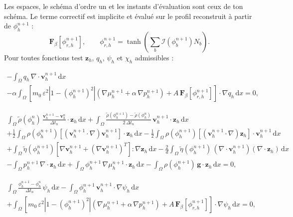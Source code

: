 Les espaces, le schéma d'ordre un et les instants d'évaluation sont ceux de ton schéma. Le terme correctif est implicite et évalué sur le profil reconstruit à partir de $\phi_h^{n+1}$ :
\begin{equation}
  \mathbf{F}_\beta[\phi_{r,h}^{n+1}],
  \qquad
  \phi_{r,h}^{n+1} = \tanh\!\left(\sum_b \mathcal{I}\!\left(\phi_b^{n+1}\right)N_b\right).
\end{equation}
Pour toutes fonctions test $\mathbf{z}_h$, $q_h$, $\psi_h$ et $\chi_h$ admissibles :

\begin{multline}\label{cp:h-continuite}
  -\int_{\Omega} q_h\,\nabla\cdot\mathbf{v}_h^{n+1}\,\mathrm{d}x\\
  - \alpha\int_{\Omega}\left[m_0\,\varepsilon^{2}\left|1-(\phi_h^{n+1})^{2}\right|
    \left(\nabla\mu_h^{n+1} + \alpha\,\nabla p_h^{n+1}\right)
    + A\,\mathbf{F}_\beta[\phi_{r,h}^{n+1}]\right]\cdot\nabla q_h\,\mathrm{d}x = 0,
\end{multline}

\begin{multline}\label{cp:h-qdm}
  \int_{\Omega} \tilde{\rho}(\phi_h^{n})\,\frac{\mathbf{v}_h^{n+1}-\mathbf{v}_h^{n}}{\Delta t_n}\cdot\mathbf{z}_h\,\mathrm{d}x
  + \int_{\Omega} \frac{\tilde{\rho}(\phi_h^{n+1}) - \tilde{\rho}(\phi_h^{n})}{2\,\Delta t_n}\,\mathbf{v}_h^{n+1}\cdot\mathbf{z}_h\,\mathrm{d}x\\
  + \frac{1}{2}\int_{\Omega} \rho(\phi_h^{n+1})\left[(\mathbf{v}_h^{n+1}\cdot\nabla)\mathbf{v}_h^{n+1}\right]\cdot\mathbf{z}_h\,\mathrm{d}x
  - \frac{1}{2}\int_{\Omega} \rho(\phi_h^{n+1})\left[(\mathbf{v}_h^{n+1}\cdot\nabla)\mathbf{z}_h\right]\cdot\mathbf{v}_h^{n+1}\,\mathrm{d}x\\
  + \int_{\Omega} \tilde{\eta}(\phi_h^{n+1})\left[\nabla\mathbf{v}_h^{n+1} + (\nabla\mathbf{v}_h^{n+1})^{T}\right] : \nabla\mathbf{z}_h\,\mathrm{d}x
  - \frac{2}{d}\int_{\Omega} \tilde{\eta}(\phi_h^{n+1})\,(\nabla\cdot\mathbf{v}_h^{n+1})(\nabla\cdot\mathbf{z}_h)\,\mathrm{d}x\\
  - \int_{\Omega} p_h^{n+1}\,\nabla\cdot\mathbf{z}_h\,\mathrm{d}x
  + \int_{\Omega} \phi_h^{n+1}\,\nabla\mu_h^{n+1}\cdot\mathbf{z}_h\,\mathrm{d}x
  - \int_{\Omega} \rho(\phi_h^{n+1})\,\mathbf{g}\cdot\mathbf{z}_h\,\mathrm{d}x = 0,
\end{multline}

\begin{multline}\label{cp:h-phase}
  \int_{\Omega} \frac{\phi_h^{n+1}-\phi_h^{n}}{\Delta t_n}\,\psi_h\,\mathrm{d}x
  - \int_{\Omega} \phi_h^{n+1}\,\mathbf{v}_h^{n+1}\cdot\nabla\psi_h\,\mathrm{d}x\\
  + \int_{\Omega}\left[m_0\,\varepsilon^{2}\left|1-(\phi_h^{n+1})^{2}\right|
    \left(\nabla\mu_h^{n+1} + \alpha\,\nabla p_h^{n+1}\right)
    + A\,\mathbf{F}_\beta[\phi_{r,h}^{n+1}]\right]\cdot\nabla\psi_h\,\mathrm{d}x = 0,
\end{multline}

